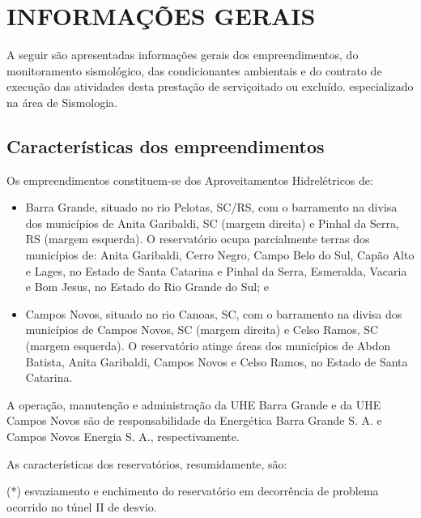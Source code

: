 \section{INFORMAÇÕES GERAIS}
A seguir são apresentadas informações gerais dos empreendimentos, do monitoramento sismológico, das condicionantes ambientais e do contrato de execução das atividades desta prestação de serviçoitado ou excluído. especializado na área de Sismologia.

\subsection{Características dos empreendimentos}
Os empreendimentos constituem-se dos Aproveitamentos Hidrelétricos de:
\begin{itemize}
    \item Barra Grande, situado no rio Pelotas, SC/RS, com o barramento na divisa dos municípios de Anita Garibaldi, SC (margem direita) e Pinhal da Serra, RS (margem esquerda). O reservatório ocupa parcialmente terras dos municípios de: Anita Garibaldi, Cerro Negro, Campo Belo do Sul, Capão Alto e Lages, no Estado de Santa Catarina e Pinhal da Serra, Esmeralda, Vacaria e Bom Jesus, no Estado do Rio Grande do Sul; e
    \item Campos Novos, situado no rio Canoas, SC, com o barramento na divisa dos municípios de Campos Novos, SC (margem direita) e Celso Ramos, SC (margem esquerda). O reservatório atinge áreas dos municípios de Abdon Batista, Anita Garibaldi, Campos Novos e Celso Ramos, no Estado de Santa Catarina.
\end{itemize}

A operação, manutenção e administração da UHE Barra Grande e da UHE Campos Novos são de responsabilidade da Energética Barra Grande S. A. e Campos Novos Energia S. A., respectivamente.

As características dos reservatórios, resumidamente, são:
\begin{table}
\end{table}
\caption{(*) esvaziamento e enchimento do reservatório em decorrência de problema ocorrido no túnel II de desvio.}


